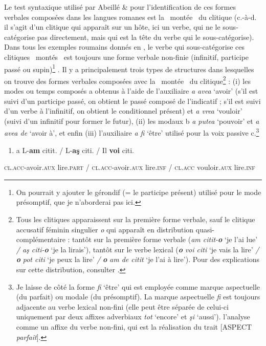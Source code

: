 Le test syntaxique utilisé par Abeillé \& \citet{Godard2003} pour l'identification de ces formes verbales composées dans les langues romanes est la {\guillemotleft}~montée~{\guillemotright} du clitique (c.-à-d. il s'agit d'un clitique qui apparaît sur un hôte, ici un verbe, qui ne le sous-catégorise pas directement, mais qui est la tête du verbe qui le sous-catégorise). Dans tous les exemples roumains donnés en , le verbe qui sous-catégorise ces clitiques {\guillemotleft}~montés~{\guillemotright} est toujours une forme verbale non-finie (infinitif, participe passé ou supin)\footnote{On pourrait y ajouter le gérondif (= le participe présent) utilisé pour le mode présomptif, que je n'aborderai pas ici.} . Il y a principalement trois types de structures dans lesquelles on trouve des formes verbales composées avec la {\guillemotleft}~montée~{\guillemotright} du clitique\footnote{Tous les clitiques apparaissent sur la première forme verbale, sauf le clitique accusatif féminin singulier \textit{o} qui apparaît en distribution quasi-complémentaire : tantôt sur la première forme verbale (\textit{am citit-}\textbf{\textit{o}} `je l'ai lue'\textit{ / aş citi-}\textbf{\textit{o}} `je la lirais'), tantôt sur le verbe lexical (\textbf{\textit{o}}\textit{ voi citi} `je vais la lire'\textit{ /} \textbf{\textit{o}}\textit{ pot citi} `je peux la lire'\textit{ /} \textbf{\textit{o}}\textit{ am de citit} `je l'ai à lire'). Pour des explications sur cette distribution, consulter \citet{Monachesi2005}.} : (i) les modes ou temps composés a obtenus à l'aide de l'auxiliaire \textit{a avea} `avoir' (s'il est suivi d'un participe passé, on obtient le passé composé de l'indicatif ; s'il est suivi d'un verbe à l'infinitif, on obtient le conditionnel présent) et \textit{a vrea} `vouloir' (suivi d'un infinitif pour former le futur), (ii) les modaux b\textit{ a putea} `pouvoir' et \textit{a avea de} `avoir à', et enfin (iii) l'auxiliaire \textit{a fi} `être' utilisé pour la voix passive c.\footnote{Je laisse de côté la forme \textit{fi} `être' qui est employée comme marque aspectuelle (du parfait) ou modale (du présomptif). La marque aspectuelle \textit{fi} est toujours adjacente au verbe lexical non-fini (elle peut être séparée de celui-ci uniquement par deux affixes adverbiaux \textit{tot} `encore' et \textit{şi} `aussi'). \citet{Barbu1999} l'analyse comme un affixe du verbe non-fini, qui est la réalisation du trait [ASPECT \textit{parfait}].}  


\begin{enumerate}
\item \label{bkm:Ref276988213}a  L-\textbf{am}  citit.     / L-\textbf{aş}     citi.  / Il   \textbf{voi}     citi.


\end{enumerate}
\textsc{cl.acc-}avoir.\textsc{aux } lire.\textsc{part / cl.acc-}avoir.\textsc{aux} lire.\textsc{inf / cl.acc} vouloir.\textsc{aux} lire.\textsc{inf}

